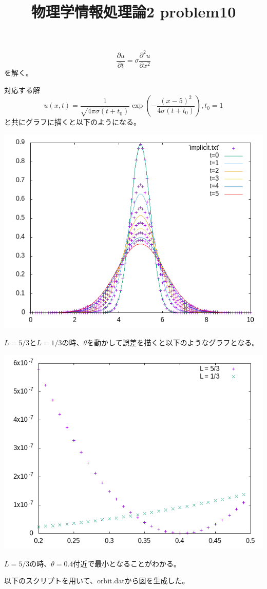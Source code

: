 \documentclass[12pt,a5]{bxjsarticle}
\title{物理学情報処理論2 problem10}
\date{}
\begin{document}
\maketitle

\section{}

\[
  \frac{\partial u}{\partial t} = \sigma \frac{\partial^2 u}{\partial x^2}
\]
を解く。

対応する解
\[
  u(x, t) = \frac{1}{\sqrt{4\pi\sigma(t+t_0)}}\exp(-\frac{(x-5)^2}{4\sigma(t+t_0)}), t_0 = 1
\]
と共にグラフに描くと以下のようになる。

\includegraphics[width=\linewidth]{graph.png}

$ L = 5/3 $と$ L = 1/3 $の時、$ \theta $を動かして誤差を描くと以下のようなグラフとなる。

\includegraphics[width=\linewidth]{errors.png}

$ L = 5/3 $の時、$ \theta = 0.4 $付近で最小となることがわかる。

以下のスクリプトを用いて、orbit.datから図を生成した。

\end{document}
